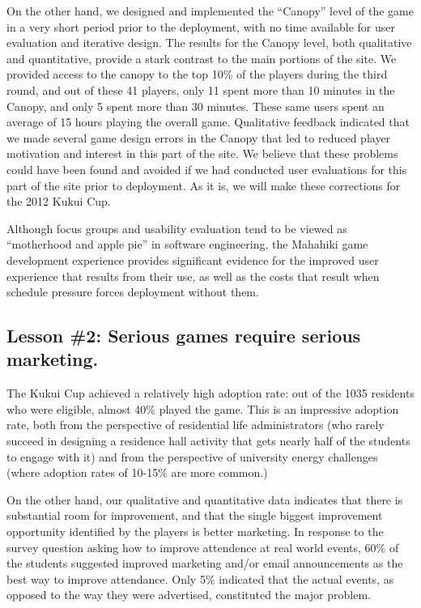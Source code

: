 \documentclass{acm_proc_article-sp}
\begin{document}
On the other hand, we designed and implemented the ``Can\-opy'' level of the
game in a very short period prior to the deployment, with no time available
for user evaluation and iterative design.  The results for the Canopy
level, both qualitative and quantitative, provide a stark contrast to the
main portions of the site.  We provided access to the canopy to the top
10\% of the players during the third round, and out of these 41 players,
only 11 spent more than 10 minutes in the Canopy, and only 5 spent more
than 30 minutes. These same users spent an average of 15 hours playing the
overall game.  Qualitative feedback indicated that we made several game
design errors in the Canopy that led to reduced player motivation and
interest in this part of the site.  We believe that these problems could
have been found and avoided if we had conducted user evaluations for this
part of the site prior to deployment.  As it is, we will make these
corrections for the 2012 Kukui Cup.

Although focus groups and usability evaluation tend to be viewed as
``motherhood and apple pie'' in software engineering, the Mahahiki game
development experience provides significant evidence for the improved user
experience that results from their use, as well as the costs that result
when schedule pressure forces deployment without them.

\subsection{Lesson \#2: Serious games require serious marketing.}

The Kukui Cup achieved a relatively high adoption rate: out of the 1035
residents who were eligible, almost 40\% played the game.  This is an
impressive adoption rate, both from the perspective of residential life
administrators (who rarely succeed in designing a residence hall activity
that gets nearly half of the students to engage with it) and from the
perspective of university energy challenges (where adoption rates of
10-15\% are more common.)  

On the other hand, our qualitative and quantitative data indicates that
there is substantial room for improvement, and that the single biggest
improvement opportunity identified by the players is better marketing.  In
response to the survey question asking how to improve attendence at real
world events, 60\% of the students suggested improved marketing and/or email
announcements as the best way to improve attendance.  Only 5\% indicated
that the actual events, as opposed to the way they were advertised,
constituted the major problem.
\end{document}
